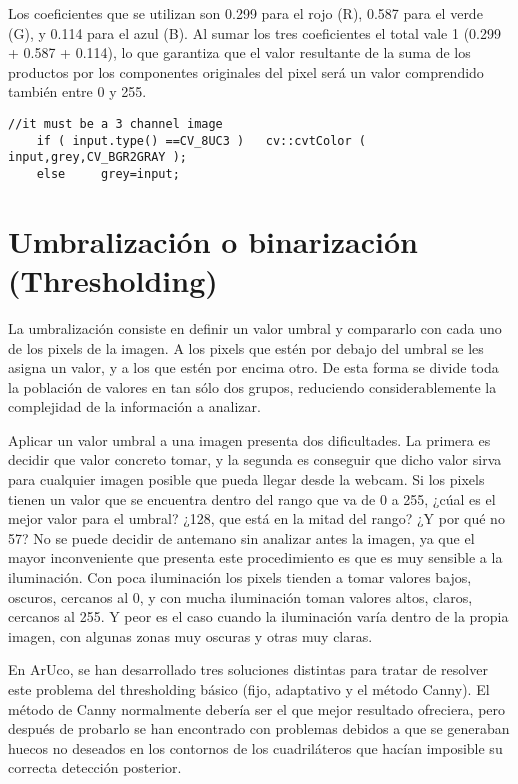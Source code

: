 \documentclass[10pt,a4paper]{article}
\begin{document}
Los coeficientes que se utilizan son 0.299 para el rojo (R), 0.587 para el verde (G), y 0.114 para el azul (B). Al sumar los tres coeficientes el total vale 1 (0.299 + 0.587 + 0.114), lo que garantiza que el valor resultante de la suma de los productos por los componentes originales del pixel será un valor comprendido también entre 0 y 255.

\begin{lstlisting}[style=C++]
 //it must be a 3 channel image
    if ( input.type() ==CV_8UC3 )   cv::cvtColor ( input,grey,CV_BGR2GRAY );
    else     grey=input;
\end{lstlisting}

\section{Umbralización o binarización (Thresholding)}
La umbralización consiste en definir un valor umbral y compararlo con cada uno de los pixels de la imagen. A los pixels que estén por debajo del umbral se les asigna un valor, y a los que estén por encima otro. De esta forma se divide toda la población de valores en tan sólo dos grupos, reduciendo considerablemente la complejidad de la información a analizar.

Aplicar un valor umbral a una imagen presenta dos dificultades. La primera es decidir que valor concreto tomar, y la segunda es conseguir que dicho valor sirva para cualquier imagen posible que pueda llegar desde la webcam. Si los pixels tienen un valor que se encuentra dentro del rango que va de 0 a 255, ¿cúal es el mejor valor para el umbral? ¿128, que está en la mitad del rango? ¿Y por qué no 57? No se puede decidir de antemano sin analizar antes la imagen, ya que el mayor inconveniente que presenta este procedimiento es que es muy sensible a la iluminación. Con poca iluminación los pixels tienden a tomar valores bajos, oscuros, cercanos al 0, y con mucha iluminación toman valores altos, claros, cercanos al 255. Y peor es el caso cuando la iluminación varía dentro de la propia imagen, con algunas zonas muy oscuras y otras muy claras.

En ArUco, se han desarrollado tres soluciones distintas para tratar de resolver este problema del thresholding básico (fijo, adaptativo y el método Canny). El método de Canny normalmente debería ser el que mejor resultado ofreciera, pero después de probarlo se han encontrado con problemas debidos a que se generaban huecos no deseados en los contornos de los cuadriláteros que hacían imposible su correcta detección posterior.
\end{document}
